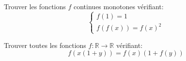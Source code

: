 \begin{exo}
Trouver les fonctions $f$ continues monotones vérifiant:
$$\begin{cases}f(1)=1\\ f(f(x))=f(x)^2\end{cases}$$
\end{exo}







\begin{exo}
Trouver toutes les fonctions $f:\mathbb{R}\rightarrow \mathbb{R}$ vérifiant:
$$f(x(1+y))=f(x)(1+f(y))$$
\end{exo}



